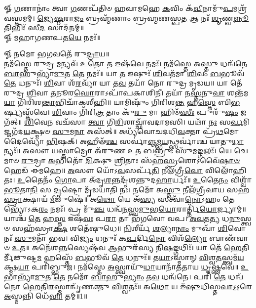 
\newpage
{}

𑍐 \ul{𑌗}\-𑌣𑌾𑌨𑌾𑌂॑ 𑌤𑍍𑌵𑌾 \ul{𑌗}\-𑌣𑌪᳴𑌤𑌿𑍞 𑌹𑌵𑌾𑌮𑌹𑍇 \ul{𑌕}\-𑌵𑌿𑌂 𑌕᳴\-\ul{𑌵𑍀}\-𑌨𑌾𑌮𑍁᳴\-\ul{𑌪}\-𑌮𑌶𑍍𑌰᳴\-𑌵𑌸𑍍𑌤𑌮𑌮𑍍। 
\-\ul{𑌜𑍍𑌯𑍇}\-\-\ul{𑌷𑍍𑌠}\-𑌰𑌾\-\ul{𑌜𑌂} 𑌬𑍍𑌰𑌹𑍍𑌮᳴𑌣𑌾𑌂 𑌬𑍍𑌰𑌹𑍍𑌮𑌣𑌸𑍍𑌪\-\ul{𑌤} 𑌆 𑌨𑌃᳴ \ul{𑌶𑍃}\-𑌣𑍍𑌵\-\ul{𑌨𑍍𑌨𑍂}\-𑌤𑌿𑌭𑌿𑌃᳴ 𑌸𑍀\-\ul{𑌦} 𑌸𑌾𑌦᳴𑌨𑌮𑍍॥ \\
𑍐 𑌮𑌹𑌾𑌗𑌣𑌪𑌤\-\ul{𑌯𑍇} 𑌨𑌮𑌃᳴॥ 

𑍐 𑌨𑌮𑍋 𑌭𑌗𑌵𑌤𑍇᳴ 𑌰𑍁\-\ul{𑌦𑍍𑌰𑌾}\-𑌯॥\\
 𑌨𑌮᳴𑌸𑍍𑌤𑍇 𑌰𑍁𑌦𑍍𑌰 \ul{𑌮}\-𑌨𑍍𑌯𑌵᳴ \ul{𑌉}\-𑌤𑍋 \ul{𑌤} 𑌇𑌷᳴\-\ul{𑌵𑍇} 𑌨𑌮𑌃᳴। 𑌨𑌮᳴𑌸𑍍𑌤𑍇 𑌅\-\ul{𑌸𑍍𑌤𑍁} 𑌧𑌨𑍍𑌵᳴𑌨𑍇 \ul{𑌬𑌾}\-𑌹𑍁𑌭𑍍𑌯𑌾᳴\-\ul{𑌮𑍁}\-𑌤 \ul{𑌤𑍇} 𑌨𑌮𑌃᳴॥ 𑌯𑌾 \ul{𑌤} 𑌇𑌷𑍁𑌃᳴ \ul{𑌶𑌿}\-𑌵𑌤᳴𑌮𑌾 \ul{𑌶𑌿}\-𑌵𑌂 \ul{𑌬}\-𑌭𑍂𑌵᳴ \ul{𑌤𑍇} 𑌧𑌨𑍁𑌃᳴। \ul{𑌶𑌿}\-𑌵𑌾 𑌶᳴\-\ul{𑌰}\-𑌵𑍍𑌯𑌾᳴ 𑌯𑌾 𑌤\-\ul{𑌵} 𑌤𑌯𑌾᳴ 𑌨𑍋 𑌰𑍁𑌦𑍍𑌰 𑌮𑍃𑌡𑌯॥ 𑌯𑌾 𑌤𑍇᳴ 𑌰𑍁𑌦𑍍𑌰 \ul{𑌶𑌿}\-𑌵𑌾 \ul{𑌤}\-𑌨𑍂𑌰\-\ul{𑌘𑍋}\-𑌰𑌾𑌽𑌪𑌾᳴𑌪𑌕𑌾𑌶𑌿𑌨𑍀। 𑌤𑌯𑌾᳴ 𑌨\-\ul{𑌸𑍍𑌤}\-𑌨𑍁\-\ul{𑌵𑌾} 𑌶𑌨𑍍𑌤᳴𑌮\-\ul{𑌯𑌾} 𑌗𑌿𑌰𑌿᳴𑌶\-\ul{𑌨𑍍𑌤𑌾}\-\-𑌭𑌿𑌚𑌾᳴𑌕𑌶𑍀𑌹𑌿॥ 𑌯𑌾𑌮𑌿𑌷𑍁𑌂᳴ 𑌗𑌿𑌰𑌿𑌶\-\ul{𑌨𑍍𑌤} 𑌹\-\ul{𑌸𑍍𑌤𑍇} 𑌬𑌿\-\ul{𑌭}\-𑌰𑍍𑌷𑍍𑌯𑌸𑍍𑌤᳴𑌵𑍇। \ul{𑌶𑌿}\-𑌵𑌾𑌂 𑌗𑌿᳴𑌰𑌿\-\ul{𑌤𑍍𑌰} 𑌤𑌾𑌂 𑌕𑍁᳴\-\ul{𑌰𑍁} 𑌮𑌾 𑌹𑌿𑍞᳴\-\ul{𑌸𑍀𑌃} 𑌪𑍁𑌰𑍁᳴\-\ul{𑌷𑌂} 𑌜𑌗᳴𑌤𑍍॥ \ul{𑌶𑌿}\-𑌵𑍇\-\ul{𑌨} 𑌵𑌚᳴𑌸𑌾 \ul{𑌤𑍍𑌵𑌾} 𑌗𑌿\-\ul{𑌰𑌿}\-𑌶𑌾𑌚𑍍𑌛𑌾᳴𑌵𑌦𑌾𑌮𑌸𑌿। 𑌯𑌥𑌾᳴ \ul{𑌨𑌃} 𑌸\-\ul{𑌰𑍍𑌵}\-𑌮𑌿𑌜𑍍𑌜𑌗᳴𑌦\-\ul{𑌯}\-𑌕𑍍𑌷𑍍𑌮𑍞 \ul{𑌸𑍁}\-𑌮\-\ul{𑌨𑌾} 𑌅𑌸᳴𑌤𑍍॥ 𑌅𑌧𑍍𑌯᳴𑌵𑍋𑌚𑌦𑌧𑌿\-\ul{𑌵}\-𑌕𑍍𑌤𑌾 𑌪𑍍𑌰᳴\-\ul{𑌥}\-𑌮𑍋 𑌦𑍈𑌵𑍍𑌯𑍋᳴ \ul{𑌭𑌿}\-𑌷𑌕𑍍।  𑌅𑌹𑍀𑍟᳴\-\ul{𑌶𑍍𑌚} 𑌸𑌰𑍍𑌵𑌾॑\-\ul{𑌞𑍍𑌜}\-𑌮𑍍𑌭\-\ul{𑌯}\-𑌨𑍍𑌥𑍍𑌸𑌰𑍍𑌵𑌾॑𑌶𑍍𑌚 𑌯𑌾𑌤𑍁\-\ul{𑌧𑌾}\-𑌨𑍍𑌯𑌃᳴॥ \ul{𑌅}\-𑌸𑍗 𑌯\-\ul{𑌸𑍍𑌤𑌾}\-𑌮𑍍𑌰𑍋 𑌅᳴\-\ul{𑌰𑍁}\-𑌣 \ul{𑌉}\-𑌤 \ul{𑌬}\-𑌭𑍍𑌰𑍁𑌃 𑌸𑍁᳴\-\ul{𑌮}\-𑌙𑍍𑌗𑌲𑌃᳴। 𑌯𑍇 \ul{𑌚𑍇}\-𑌮𑌾𑍞 \ul{𑌰𑍁}\-𑌦𑍍𑌰𑌾 \ul{𑌅}\-𑌭𑌿𑌤𑍋᳴ \ul{𑌦𑌿}\-𑌕𑍍𑌷𑍁 \ul{𑌶𑍍𑌰𑌿}\-𑌤𑌾𑌃 𑌸᳴𑌹\-\ul{𑌸𑍍𑌰}\-𑌶𑍋𑌽𑌵𑍈᳴\-\ul{𑌷𑌾}\-\-\ul{𑍞} 𑌹𑍇𑌡᳴ 𑌈𑌮𑌹𑍇॥ \ul{𑌅}\-𑌸𑍗 𑌯𑍋᳴𑌽\-\ul{𑌵}\-𑌸𑌰𑍍𑌪᳴\-\ul{𑌤𑌿} 𑌨𑍀𑌲᳴𑌗𑍍𑌰𑍀\-\ul{𑌵𑍋} 𑌵𑌿𑌲𑍋᳴𑌹𑌿𑌤𑌃। \ul{𑌉}\-𑌤𑍈𑌨𑌂᳴ \ul{𑌗𑍋}\-𑌪𑌾 𑌅᳴𑌦𑍃\-\ul{𑌶}\-\-\ul{𑌨𑍍𑌨}\-𑌦𑍃᳴𑌶𑌨𑍍𑌨𑍁𑌦\-\ul{𑌹𑌾}\-𑌰𑍍𑌯𑌃᳴॥ \ul{𑌉}\-𑌤𑍈\-\ul{𑌨𑌂} 𑌵𑌿𑌶𑍍𑌵𑌾᳴ \ul{𑌭𑍂}\-𑌤𑌾\-\ul{𑌨𑌿} 𑌸 \ul{𑌦𑍃}\-𑌷𑍍𑌟𑍋 𑌮𑍃᳴𑌡𑌯𑌾𑌤𑌿 𑌨𑌃। 𑌨𑌮𑍋᳴ 𑌅\-\ul{𑌸𑍍𑌤𑍁} 𑌨𑍀𑌲᳴𑌗𑍍𑌰𑍀𑌵𑌾𑌯 𑌸𑌹\-\ul{𑌸𑍍𑌰𑌾}\-𑌕𑍍𑌷𑌾𑌯᳴ \ul{𑌮𑍀}\-𑌢𑍁𑌷𑍇॑॥ 𑌅\-\ul{𑌥𑍋} 𑌯𑍇 𑌅᳴\-\ul{𑌸𑍍𑌯} 𑌸𑌤𑍍𑌵𑌾᳴\-\ul{𑌨𑍋}\-𑌽𑌹𑌂 𑌤𑍇𑌭𑍍𑌯𑍋᳴𑌽𑌕\-\ul{𑌰𑌂} 𑌨𑌮𑌃᳴। 𑌪𑍍𑌰 𑌮𑍁᳴\-\ul{𑌞𑍍𑌚} 𑌧𑌨𑍍𑌵᳴\-\ul{𑌨}\-𑌸𑍍𑌤𑍍𑌵\-\ul{𑌮𑍁}\-𑌭\-\ul{𑌯𑍋}\-𑌰𑌾𑌰𑍍𑌤𑍍𑌨𑌿᳴\-\ul{𑌯𑍋}\-𑌰𑍍𑌜𑍍𑌯𑌾𑌮𑍍॥ 𑌯𑌾𑌶𑍍𑌚᳴ \ul{𑌤𑍇} 𑌹\-\ul{𑌸𑍍𑌤} 𑌇𑌷᳴\-\ul{𑌵𑌃} 𑌪\-\ul{𑌰𑌾} 𑌤𑌾 𑌭᳴𑌗𑌵𑍋 𑌵𑌪। \ul{𑌅}\-\-\ul{𑌵}\-𑌤\-\ul{𑌤𑍍𑌯} 𑌧\-\ul{𑌨𑍁}\-𑌸𑍍𑌤𑍍𑌵𑍞 𑌸𑌹᳴𑌸𑍍𑌰𑌾\-\ul{𑌕𑍍𑌷} 𑌶𑌤𑍇᳴𑌷𑍁𑌧𑍇॥ \ul{𑌨𑌿}\-𑌶𑍀𑌰𑍍𑌯᳴ \ul{𑌶}\-𑌲𑍍𑌯𑌾\-\ul{𑌨𑌾𑌂} 𑌮𑍁𑌖𑌾᳴ \ul{𑌶𑌿}\-𑌵𑍋 𑌨𑌃᳴ \ul{𑌸𑍁}\-𑌮𑌨𑌾᳴ 𑌭𑌵। 𑌵𑌿\-\ul{𑌜𑍍𑌯𑌂} 𑌧𑌨𑍁𑌃᳴ 𑌕\-\ul{𑌪}\-𑌰𑍍𑌦𑌿\-\ul{𑌨𑍋} 𑌵𑌿𑌶᳴\-\ul{𑌲𑍍𑌯𑍋} 𑌬𑌾𑌣᳴𑌵𑌾𑍞 \ul{𑌉}\-𑌤॥
 𑌅𑌨𑍇᳴𑌶\-\ul{𑌨𑍍𑌨}\-\-𑌸𑍍𑌯𑍇𑌷᳴𑌵 \ul{𑌆}\-𑌭𑍁𑌰᳴𑌸𑍍𑌯 𑌨𑌿\-\ul{𑌷}\-𑌙𑍍𑌗𑌥𑌿𑌃᳴। 𑌯𑌾 𑌤𑍇᳴ \ul{𑌹𑍇}\-𑌤𑌿𑌰𑍍𑌮𑍀᳴𑌢𑍁𑌷𑍍𑌟\-\ul{𑌮} 𑌹𑌸𑍍𑌤𑍇᳴ \ul{𑌬}\-𑌭𑍂𑌵᳴ \ul{𑌤𑍇} 𑌧𑌨𑍁𑌃᳴॥ 𑌤\-\ul{𑌯𑌾}\-𑌽𑌸𑍍𑌮𑌾𑌨𑍍 \ul{𑌵𑌿}\-𑌶𑍍𑌵\-\ul{𑌤}\-𑌸𑍍𑌤𑍍𑌵𑌮᳴\-\ul{𑌯}\-𑌕𑍍𑌷𑍍𑌮\-\ul{𑌯𑌾} 𑌪𑌰𑌿᳴𑌬𑍍𑌭𑍁𑌜। 𑌨𑌮᳴𑌸𑍍𑌤𑍇 \ul{𑌅}\-𑌸𑍍𑌤𑍍𑌵𑌾𑌯𑍁᳴\-\ul{𑌧𑌾}\-𑌯𑌾𑌨𑌾᳴𑌤𑌤𑌾𑌯 \ul{𑌧𑍃}\-𑌷𑍍𑌣𑌵𑍇॑॥ \ul{𑌉}\-𑌭𑌾𑌭𑍍𑌯𑌾᳴\-\ul{𑌮𑍁}\-𑌤 \ul{𑌤𑍇} 𑌨𑌮𑍋᳴ \ul{𑌬𑌾}\-𑌹𑍁\-\ul{𑌭𑍍𑌯𑌾𑌂} 𑌤\-\ul{𑌵} 𑌧𑌨𑍍𑌵᳴𑌨𑍇। 𑌪𑌰𑌿᳴ \ul{𑌤𑍇} 𑌧𑌨𑍍𑌵᳴𑌨𑍋 \ul{𑌹𑍇}\-𑌤𑌿\-\ul{𑌰}\-𑌸𑍍𑌮𑌾𑌨𑍍𑌵𑍃᳴𑌣𑌕𑍍𑌤𑍁 \ul{𑌵𑌿}\-𑌶𑍍𑌵𑌤𑌃᳴॥ 𑌅\-\ul{𑌥𑍋} 𑌯 𑌇᳴\-\ul{𑌷𑍁}\-𑌧𑌿𑌸𑍍𑌤\-\ul{𑌵𑌾}\-𑌽॒𑌽॒𑌰𑍇 \ul{𑌅}\-𑌸𑍍𑌮𑌨𑍍𑌨𑌿 𑌧𑍇᳴\-\ul{𑌹𑌿} 𑌤𑌮𑍍॥1॥

